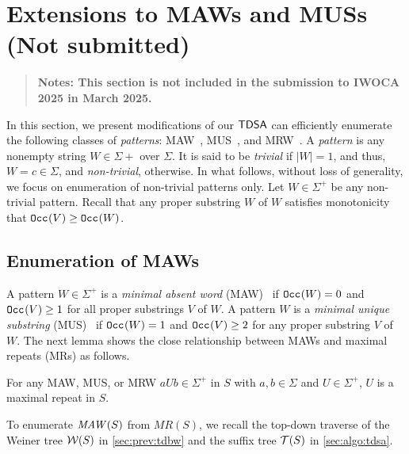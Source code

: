 \section{Extensions to MAWs and MUSs (Not submitted)}
\label{sec:mrw}

\begin{quote}\large\bf
  Notes: This section is not included in the submission to IWOCA 2025 in March 2025.
\end{quote}

In this section, we present modifications of our $\textsf{TDSA}$ can efficiently enumerate the following classes of \textit{patterns}:  
MAW~\cite{crochemore1998automata}, 
MUS~\cite{ilie2011minimum}, and
MRW~\cite{belazzougui2015space:unusual}. 
A \textit{pattern} is any nonempty string $W \in \Sigma+$ over $\Sigma$. 
It is said to be \textit{trivial} if $|W|=1$, and thus, $W=c \in \Sigma$, and \textit{non-trivial}, otherwise.
In what follows, without loss of generality, we focus on enumeration of non-trivial patterns only. 
Let $W \in \Sigma^+$ be any non-trivial pattern. Recall that any proper substring $W$ of $W$ satisfies monotonicity that $\mathtt{Occ}_{}(V) \ge \mathtt{Occ}_{}(W)$. 

\subsection{Enumeration of MAWs}
\label{secsub:mrw}

A pattern $W \in \Sigma^+$ is a \textit{minimal absent word} (MAW)~\cite{crochemore1998automata} if $\mathtt{Occ}_{}(W) = 0$ and $\mathtt{Occ}_{}(V)\ge 1$ for all proper substrings $V$ of $W$.
A pattern $W$ is a \textit{minimal unique substring} (MUS)~\cite{ilie2011minimum} if $\mathtt{Occ}_{}(W) = 1$ and $\mathtt{Occ}_{}(V)\ge 2$ for any proper substring $V$ of $W$.
The next lemma shows the close relationship between MAWs and maximal repeats (MRs) as follows.  

\begin{lemma}\label{lem:mrw:mr}
  For any MAW, MUS, or MRW $aUb \in \Sigma^+$ in $S$ with $a,b \in \Sigma$ and $U\in \Sigma^+$, $U$ is a maximal repeat in $S$.
\end{lemma}

To enumerate $\MAW(S)$ from $MR(S)$, we recall the top-down traverse of the Weiner tree $\mathcal{W}(S)$  in \cref{sec:prev:tdbw} and the suffix tree $\mathcal{T}(S)$ in \cref{sec:algo:tdsa}. 


